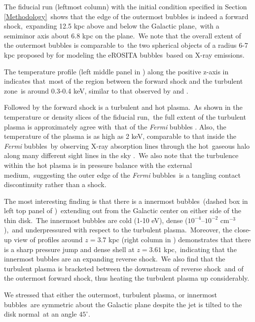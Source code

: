 \documentclass[twocolumn]{aastex631}
\begin{document}
 The fiducial run (leftmost column) with the initial condition specified in Section \ref{Methodology}\
 shows that the edge of the outermost bubbles is indeed a forward shock,\
 expanding 12.5 kpc above and below the Galactic plane,\
 with a semiminor axis about 6.8 kpc on the plane.\
 We note that the overall extent of the outermost bubbles is comparable to\
 the two spherical objects of a radius 6-7 kpc proposed by \citet{Predehl2020} for modeling the eROSITA bubbles\
 based on X-ray emissions.

 The temperature profile (left middle panel in ) along the positive z-axis in\
  indicates that\
 most of the region between the forward shock and the turbulent zone\
 is around 0.3-0.4 keV, similar to that observed by \citet{Miller2016} and \citet{Kataoka2018}.

 Followed by the forward shock is a turbulent and hot plasma.\
 As shown in the temperature or density slices of the fiducial run,\
 the full extent of the turbulent plasma is approximately agree with\
 that of the \textit{Fermi} bubbles \citep{Su2010}.
 Also, the temperature of the plasma is as high as 2 keV, comparable to that inside the \textit{Fermi} bubbles\
 by observing X-ray absorption lines through the hot\
 gaseous halo along many different sight lines in the sky \citep{Miller_2013}.\
 We also note that the turbulence within the hot plasma is in pressure balance with the external medium,\
 suggesting the outer edge of the \textit{Fermi} bubbles\
 is a tangling contact discontinuity rather than a shock.

 The most interesting finding is that there is a innermost bubbles\
 (dashed box in left top panel of )\
 extending out from the Galactic center on either side of the thin disk.\
 The innermost bubbles are cold (1-10 eV), dense ($10^{-4}$--$10^{-2}$ cm$^{-3}$),\
 and underpressured with respect to the turbulent plasma.\
 Moreover, the close-up view of profiles around $z=3.7$ kpc (right column in )
 demonstrates that there is a sharp pressure jump and dense shell at $z=3.61$ kpc,\
 indicating that the innermost bubbles are an expanding reverse shock.\
 We also find that the turbulent plasma is bracketed between the downstream of reverse shock\
 and of the outermost forward shock, thus heating the turbulent plasma up considerably.

 We stressed that either the outermost, turbulent plasma, or innermost bubbles\
 are symmetric about the Galactic plane despite the jet is tilted to the disk normal\
 at an angle $45^{\circ}$.
\end{document}
